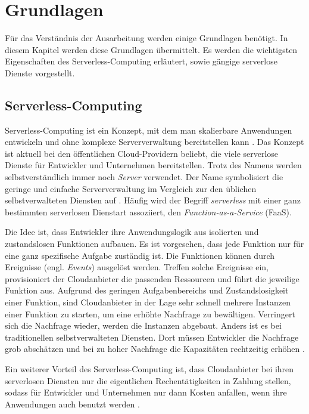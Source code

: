 \chapter{Grundlagen}
Für das Verständnis der Ausarbeitung werden einige Grundlagen benötigt.
In diesem Kapitel werden diese Grundlagen übermittelt.
Es werden die wichtigsten Eigenschaften des Serverless-Computing erläutert,
sowie gängige serverlose Dienste vorgestellt.

\section{Serverless-Computing}
Serverless-Computing ist ein Konzept, mit dem man skalierbare Anwendungen
entwickeln und ohne komplexe Serververwaltung bereitstellen kann \cite{CioGov}.
Das Konzept ist aktuell bei den öffentlichen Cloud-Providern beliebt, die viele
serverlose Dienste für Entwickler und Unternehmen bereitstellen. Trotz des Namens
werden selbstverständlich immer noch \textit{Server} verwendet. Der Name symbolisiert die geringe
und einfache Serververwaltung im Vergleich zur den üblichen selbstverwalteten
Diensten auf \cite{CNCF}.
Häufig wird der Begriff \textit{serverless} mit einer ganz bestimmten serverlosen Dienstart
assoziiert, den \textit{Function-as-a-Service} (FaaS).

Die Idee ist, dass Entwickler ihre Anwendungslogik aus isolierten und 
zustandslosen Funktionen aufbauen. Es ist vorgesehen, dass jede Funktion nur für eine
ganz spezifische Aufgabe zuständig ist. Die Funktionen können
durch Ereignisse (engl. \textit{Events}) ausgelöst werden. Treffen solche Ereignisse ein,
provisioniert der Cloudanbieter die passenden Ressourcen und führt die jeweilige Funktion aus.
Aufgrund des geringen Aufgabenbereichs und Zustandslosigkeit einer Funktion,
sind Cloudanbieter in der Lage sehr schnell mehrere Instanzen einer Funktion zu starten,
um eine erhöhte Nachfrage zu bewältigen.
Verringert sich die Nachfrage wieder, werden die Instanzen abgebaut. Anders ist 
es bei traditionellen selbstverwalteten Diensten. Dort müssen Entwickler die Nachfrage grob
abschätzen und bei zu hoher Nachfrage die Kapazitäten rechtzeitig
erhöhen \cite{WhatIsServerless} \cite{ServerlessTrends}.

Ein weiterer Vorteil des Serverless-Computing ist, dass Cloudanbieter
bei ihren serverlosen Diensten nur die eigentlichen Rechentätigkeiten
in Zahlung stellen, sodass für Entwickler und Unternehmen nur dann Kosten
anfallen, wenn ihre Anwendungen auch benutzt werden \cite{EcoArc}.

